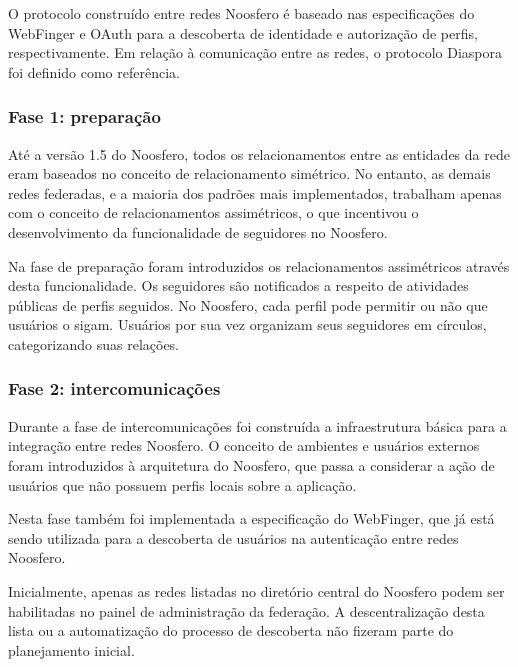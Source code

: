
O protocolo construído entre redes Noosfero é baseado nas especificações do
WebFinger e OAuth para a descoberta de identidade e autorização de perfis,
respectivamente. Em relação à comunicação entre as redes, o protocolo Diaspora foi
definido como referência. 

\subsubsection{Fase 1: preparação}

Até a versão 1.5 do Noosfero, todos os relacionamentos entre as entidades da rede
eram baseados no conceito de relacionamento simétrico. No entanto, as demais redes
federadas, e a maioria dos padrões mais implementados, trabalham apenas com o
conceito de relacionamentos assimétricos, o que incentivou o desenvolvimento da
funcionalidade de seguidores no Noosfero.

Na fase de preparação foram introduzidos os relacionamentos assimétricos através
desta funcionalidade. Os seguidores são notificados a respeito de atividades
públicas de perfis seguidos. No Noosfero, cada perfil pode permitir ou não que
usuários o sigam. Usuários por sua vez organizam seus seguidores em círculos,
categorizando suas relações.

\subsubsection{Fase 2: intercomunicações}


Durante a fase de intercomunicações foi construída a infraestrutura básica para a
integração entre redes Noosfero. O conceito de ambientes e usuários externos foram
introduzidos à arquitetura do Noosfero, que passa a considerar a ação de usuários
que não possuem perfis locais sobre a aplicação.

Nesta fase também foi implementada a especificação do WebFinger, que já está sendo
utilizada para a descoberta de usuários na autenticação entre redes Noosfero.

Inicialmente, apenas as redes listadas no diretório central do Noosfero podem ser
habilitadas no painel de administração da federação. A descentralização desta lista
ou a automatização do processo de descoberta não fizeram parte do planejamento
inicial.

